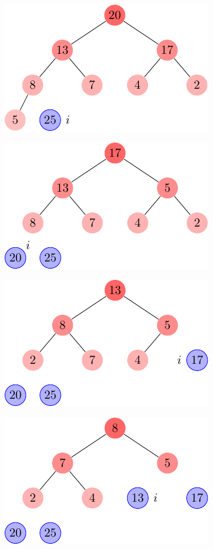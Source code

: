 \begin{description}
\begin{ex}
\begin{figure}[t]
\begin{subfigure}[t]{.30\textwidth}
          \centering
          \includegraphics[scale=0.8]{img/6_4-1/6_4-1_3}
          \caption{}\label{fig:6_4-1_3}
        \end{subfigure}
        \begin{subfigure}[t]{.30\textwidth}
          \centering
          \includegraphics[scale=0.8]{img/6_4-1/6_4-1_4}
          \caption{}\label{fig:6_4-1_4}
        \end{subfigure}
        \begin{subfigure}[t]{.30\textwidth}
          \centering
          \includegraphics[scale=0.8]{img/6_4-1/6_4-1_5}
          \caption{}\label{fig:6_4-1_5}
        \end{subfigure}
        \begin{subfigure}[t]{.30\textwidth}
          \centering
          \includegraphics[scale=0.8]{img/6_4-1/6_4-1_6}

\end{subfigure}
\end{figure}
\end{ex}
\end{description}
